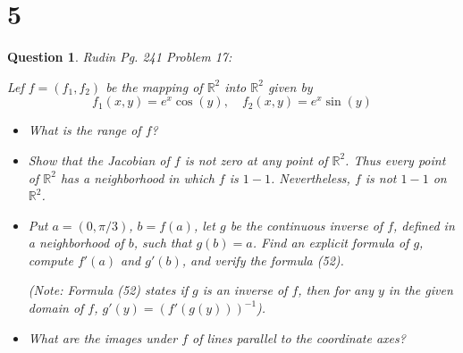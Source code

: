 \documentclass{article}
\newtheorem{question}{Question}
\begin{document}
\section*{5}
\begin{myBox}[]{}
    \begin{question}
        Rudin Pg. 241 Problem 17:

        Lef $f=(f_1,f_2)$ be the mapping of $\mathbb{R}^2$ into $\mathbb{R}^2$ given by 
        $$f_1(x,y)=e^x\cos(y),\quad f_2(x,y)=e^x\sin(y)$$
        \begin{itemize}
            \item[(a)] What is the range of $f$?
            \item[(b)] Show that the Jacobian of $f$ is not zero at any point of $\mathbb{R}^2$. Thus every point of $\mathbb{R}^2$
            has a neighborhood in which $f$ is $1-1$. Nevertheless, $f$ is not $1-1$ on $\mathbb{R}^2$.
            \item[(c)] Put $a=(0,\pi/3)$, $b=f(a)$, let $g$ be the continuous inverse of $f$, defined in a neighborhood of $b$, such that $g(b)=a$.
            Find an explicit formula of $g$, compute $f'(a)$ and $g'(b)$, and verify the formula (52).

            (Note: Formula (52) states if $g$ is an inverse of $f$, then for any $y$ in the given domain of $f$, $g'(y)=(f'(g(y)))^{-1}$).
            \item[(d)] What are the images under $f$ of lines parallel to the coordinate axes?
        \end{itemize}
    \end{question}
\end{myBox}
\end{document}

